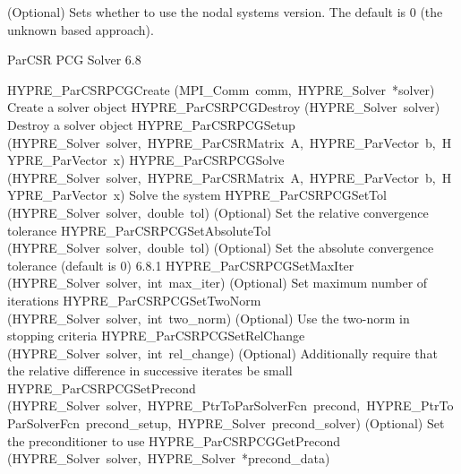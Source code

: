 \documentclass{article}
\begin{document}
\begin{cxxentry}
\begin{cxxentry}
\begin{cxxfunction}
\begin{cxxdoc}
(Optional) Sets whether to use the nodal systems version.
The default is 0 (the unknown based approach).
\end{cxxdoc}
\end{cxxfunction}
\end{cxxentry}
\begin{cxxentry}
{}
        {ParCSR PCG Solver}
        {}
        {
}
        {6.8}
\begin{cxxnames}
        {HYPRE\_ParCSRPCGCreate}
        {(MPI\_Comm\ comm,\ HYPRE\_Solver\ *solver)}
        {
Create a solver object}
        {}
\label{cxx.6.8.2}
        {HYPRE\_ParCSRPCGDestroy}
        {(HYPRE\_Solver\ solver)}
        {
Destroy a solver object}
        {}
\label{cxx.6.8.3}
        {HYPRE\_ParCSRPCGSetup}
        {(HYPRE\_Solver\ solver,\ HYPRE\_ParCSRMatrix\ A,\ HYPRE\_ParVector\ b,\ HYPRE\_ParVector\ x)}
        {}
        {}
\label{cxx.6.8.4}
        {HYPRE\_ParCSRPCGSolve}
        {(HYPRE\_Solver\ solver,\ HYPRE\_ParCSRMatrix\ A,\ HYPRE\_ParVector\ b,\ HYPRE\_ParVector\ x)}
        {
Solve the system}
        {}
\label{cxx.6.8.5}
        {HYPRE\_ParCSRPCGSetTol}
        {(HYPRE\_Solver\ solver,\ double\ tol)}
        {
(Optional) Set the relative convergence tolerance}
        {}
\label{cxx.6.8.6}
        {HYPRE\_ParCSRPCGSetAbsoluteTol}
        {(HYPRE\_Solver\ solver,\ double\ tol)}
        {
(Optional) Set the absolute convergence tolerance (default is
0)}
        {6.8.1}
        {HYPRE\_ParCSRPCGSetMaxIter}
        {(HYPRE\_Solver\ solver,\ int\ max\_iter)}
        {
(Optional) Set maximum number of iterations}
        {}
\label{cxx.6.8.7}
        {HYPRE\_ParCSRPCGSetTwoNorm}
        {(HYPRE\_Solver\ solver,\ int\ two\_norm)}
        {
(Optional) Use the two-norm in stopping criteria}
        {}
\label{cxx.6.8.8}
        {HYPRE\_ParCSRPCGSetRelChange}
        {(HYPRE\_Solver\ solver,\ int\ rel\_change)}
        {
(Optional) Additionally require that the relative difference in
successive iterates be small}
        {}
\label{cxx.6.8.9}
        {HYPRE\_ParCSRPCGSetPrecond}
        {(HYPRE\_Solver\ solver,\ HYPRE\_PtrToParSolverFcn\ precond,\ HYPRE\_PtrToParSolverFcn\ precond\_setup,\ HYPRE\_Solver\ precond\_solver)}
        {
(Optional) Set the preconditioner to use}
        {}
\label{cxx.6.8.10}
        {HYPRE\_ParCSRPCGGetPrecond}
        {(HYPRE\_Solver\ solver,\ HYPRE\_Solver\ *precond\_data)}
        {}
        {}
\label{cxx.6.8.11}

\end{cxxnames}
\end{cxxentry}
\end{cxxentry}
\end{document}
